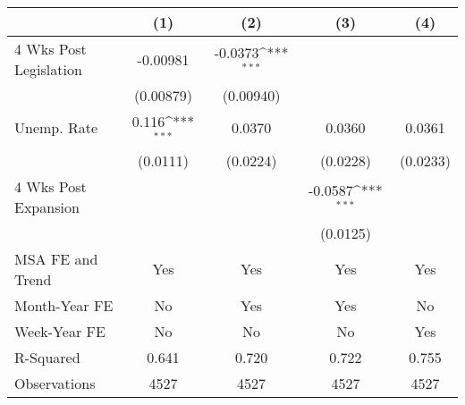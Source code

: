 {
\def\sym#1{\ifmmode^{#1}\else\(^{#1}\)\fi}
\begin{tabular}{l*{4}{c}}
\hline\hline
                    &\multicolumn{1}{c}{(1)}         &\multicolumn{1}{c}{(2)}         &\multicolumn{1}{c}{(3)}         &\multicolumn{1}{c}{(4)}         \\
\hline
4 Wks Post Legislation&    -0.00981         &     -0.0373\sym{***}&                     &                     \\
                    &   (0.00879)         &   (0.00940)         &                     &                     \\
[1em]
Unemp. Rate         &       0.116\sym{***}&      0.0370         &      0.0360         &      0.0361         \\
                    &    (0.0111)         &    (0.0224)         &    (0.0228)         &    (0.0233)         \\
[1em]
4 Wks Post Expansion&                     &                     &     -0.0587\sym{***}&                     \\
                    &                     &                     &    (0.0125)         &                     \\
\hline
MSA FE and Trend    &         Yes         &         Yes         &         Yes         &         Yes         \\
Month-Year FE       &          No         &         Yes         &         Yes         &          No         \\
Week-Year FE        &          No         &          No         &          No         &         Yes         \\
R-Squared           &       0.641         &       0.720         &       0.722         &       0.755         \\
Observations        &        4527         &        4527         &        4527         &        4527         \\
\hline\hline
\end{tabular}
}
